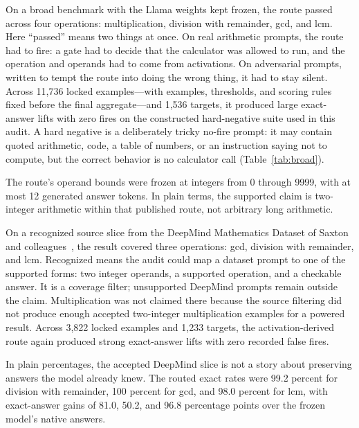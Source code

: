 \documentclass[acmsmall,screen,nonacm]{acmart}
\begin{document}
On a broad benchmark with the Llama weights kept frozen, the route passed across
four operations: multiplication, division with remainder, gcd, and lcm. Here
``passed'' means two things at once. On real arithmetic prompts, the route had
to fire: a gate had to decide that the calculator was allowed to run, and the
operation and operands had to come from activations. On adversarial prompts,
written to tempt the route into doing the wrong thing, it had to stay silent.
Across 11,736 locked examples---with examples, thresholds, and scoring rules
fixed before the final aggregate---and 1,536 targets, it produced large
exact-answer lifts with zero fires on the constructed hard-negative suite used
in this audit. A hard negative is a deliberately tricky no-fire prompt: it may
contain quoted arithmetic, code, a table of numbers, or an instruction saying
not to compute, but the correct behavior is no calculator call
(Table~\ref{tab:broad}).

The route's operand bounds were frozen at integers from 0 through 9999, with at
most 12 generated answer tokens. In plain terms, the supported claim is
two-integer arithmetic within that published route, not arbitrary long
arithmetic.

On a recognized source slice from the DeepMind Mathematics Dataset of Saxton
and colleagues~\cite{saxton2019}, the result covered three operations: gcd,
division with remainder, and lcm. Recognized means the audit could map a dataset
prompt to one of the supported forms: two integer operands, a supported
operation, and a checkable answer. It is a coverage filter; unsupported
DeepMind prompts remain outside the claim. Multiplication was not claimed there
because the source filtering did not produce enough accepted two-integer
multiplication examples for a powered result. Across 3,822 locked examples and
1,233 targets, the activation-derived route again produced strong exact-answer
lifts with zero recorded false fires.

In plain percentages, the accepted DeepMind slice is not a story about
preserving answers the model already knew. The routed exact rates were 99.2
percent for division with remainder, 100 percent for gcd, and 98.0 percent for
lcm, with exact-answer gains of 81.0, 50.2, and 96.8 percentage points over the
frozen model's native answers.
\end{document}
